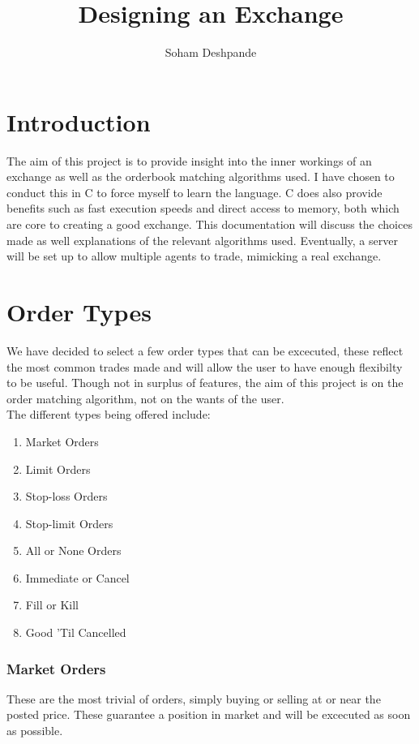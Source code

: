 \documentclass[12pt]{article}
\begin{document}
\title{Designing an Exchange}
\author{Soham Deshpande}
\maketitle
\clearpage

\tableofcontents

\clearpage
\section{Introduction}
The aim of this project is to provide insight into the inner workings of an 
exchange as well as the orderbook matching algorithms used. I have chosen
to conduct this in C to force myself to learn the language. C does also provide
benefits such as fast execution speeds and direct access to memory, both which
are core to creating a good exchange. This documentation will discuss the 
choices made as well explanations of the relevant algorithms used. Eventually,
a server will be set up to allow multiple agents to trade, mimicking a real
exchange. 
  

\section{Order Types}
We have decided to select a few order types that can be excecuted, these reflect
the most common trades made and will allow the user to have enough flexibilty
to be useful. Though not in surplus of features, the aim of this project is on
the order matching algorithm, not on the wants of the user.
\\
The different types being offered include:
\begin{enumerate}
  \item Market Orders
  \item Limit Orders
  \item Stop-loss Orders
  \item Stop-limit Orders
  \item All or None Orders 
  \item Immediate or Cancel
  \item Fill or Kill
  \item Good 'Til Cancelled
\end{enumerate}

\subsubsection{Market Orders}
These are the most trivial of orders, simply buying or selling at or near the 
posted price. These guarantee a position in market and will be excecuted as 
soon as possible. 
\end{document}
